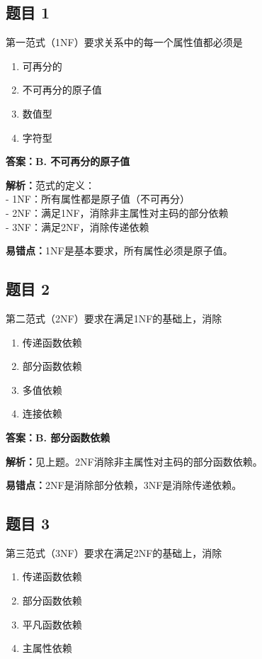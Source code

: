 \documentclass[12pt,a4paper]{ctexart}
\begin{document}
\subsection*{题目 1}
第一范式（1NF）要求关系中的每一个属性值都必须是
\begin{enumerate}[label=\Alph*.]
	\item 可再分的
	\item 不可再分的原子值
	\item 数值型
	\item 字符型
\end{enumerate}

\begin{answerbox}
	\textbf{答案：B. 不可再分的原子值}

	\textbf{解析：}范式的定义：\\
	- 1NF：所有属性都是原子值（不可再分）\\
	- 2NF：满足1NF，消除非主属性对主码的部分依赖\\
	- 3NF：满足2NF，消除传递依赖

	\textbf{易错点：}1NF是基本要求，所有属性必须是原子值。
\end{answerbox}

\subsection*{题目 2}
第二范式（2NF）要求在满足1NF的基础上，消除
\begin{enumerate}[label=\Alph*.]
	\item 传递函数依赖
	\item 部分函数依赖
	\item 多值依赖
	\item 连接依赖
\end{enumerate}

\begin{answerbox}
	\textbf{答案：B. 部分函数依赖}

	\textbf{解析：}见上题。2NF消除非主属性对主码的部分函数依赖。

	\textbf{易错点：}2NF是消除部分依赖，3NF是消除传递依赖。
\end{answerbox}

\subsection*{题目 3}
第三范式（3NF）要求在满足2NF的基础上，消除
\begin{enumerate}[label=\Alph*.]
	\item 传递函数依赖
	\item 部分函数依赖
	\item 平凡函数依赖
	\item 主属性依赖
\end{enumerate}
\end{document}
